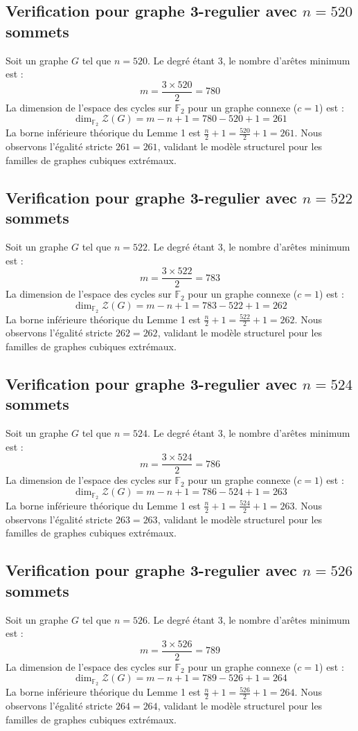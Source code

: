 \documentclass[11pt,a4paper]{article}
\begin{document}
\subsection{Verification pour graphe 3-regulier avec $n=520$ sommets}
Soit un graphe $G$ tel que $n = 520$. Le degré étant 3, le nombre d'arêtes minimum est :
$$ m = \frac{3 \times 520}{2} = 780 $$
La dimension de l'espace des cycles sur $\mathbb{F}_2$ pour un graphe connexe ($c=1$) est :
$$ \dim_{\mathbb{F}_2} \mathcal{Z}(G) = m - n + 1 = 780 - 520 + 1 = 261 $$
La borne inférieure théorique du Lemme 1 est $\frac{n}{2} + 1 = \frac{520}{2} + 1 = 261$.
Nous observons l'égalité stricte $261 = 261$, validant le modèle structurel pour les familles de graphes cubiques extrémaux.

\subsection{Verification pour graphe 3-regulier avec $n=522$ sommets}
Soit un graphe $G$ tel que $n = 522$. Le degré étant 3, le nombre d'arêtes minimum est :
$$ m = \frac{3 \times 522}{2} = 783 $$
La dimension de l'espace des cycles sur $\mathbb{F}_2$ pour un graphe connexe ($c=1$) est :
$$ \dim_{\mathbb{F}_2} \mathcal{Z}(G) = m - n + 1 = 783 - 522 + 1 = 262 $$
La borne inférieure théorique du Lemme 1 est $\frac{n}{2} + 1 = \frac{522}{2} + 1 = 262$.
Nous observons l'égalité stricte $262 = 262$, validant le modèle structurel pour les familles de graphes cubiques extrémaux.

\subsection{Verification pour graphe 3-regulier avec $n=524$ sommets}
Soit un graphe $G$ tel que $n = 524$. Le degré étant 3, le nombre d'arêtes minimum est :
$$ m = \frac{3 \times 524}{2} = 786 $$
La dimension de l'espace des cycles sur $\mathbb{F}_2$ pour un graphe connexe ($c=1$) est :
$$ \dim_{\mathbb{F}_2} \mathcal{Z}(G) = m - n + 1 = 786 - 524 + 1 = 263 $$
La borne inférieure théorique du Lemme 1 est $\frac{n}{2} + 1 = \frac{524}{2} + 1 = 263$.
Nous observons l'égalité stricte $263 = 263$, validant le modèle structurel pour les familles de graphes cubiques extrémaux.

\subsection{Verification pour graphe 3-regulier avec $n=526$ sommets}
Soit un graphe $G$ tel que $n = 526$. Le degré étant 3, le nombre d'arêtes minimum est :
$$ m = \frac{3 \times 526}{2} = 789 $$
La dimension de l'espace des cycles sur $\mathbb{F}_2$ pour un graphe connexe ($c=1$) est :
$$ \dim_{\mathbb{F}_2} \mathcal{Z}(G) = m - n + 1 = 789 - 526 + 1 = 264 $$
La borne inférieure théorique du Lemme 1 est $\frac{n}{2} + 1 = \frac{526}{2} + 1 = 264$.
Nous observons l'égalité stricte $264 = 264$, validant le modèle structurel pour les familles de graphes cubiques extrémaux.
\end{document}
